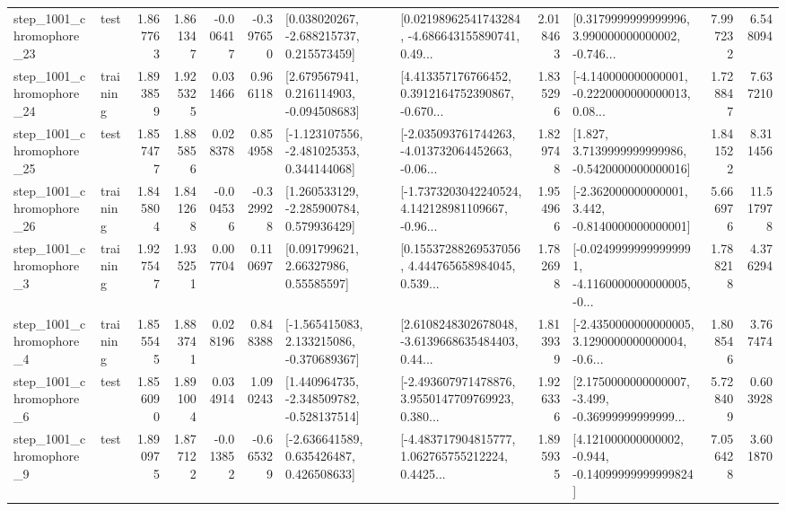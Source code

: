 \begin{tabular}{llrrrrllrlrr}
 step\_1001\_chromophore\_23 &      test &      1.867763 &    1.861347 &     -0.006417 & -0.397650 &    [0.038020267, -2.688215737, 0.215573459] &  [0.02198962541743284, -4.686643155890741, 0.49... &       2.018463 &  [0.3179999999999996, 3.990000000000002, -0.746... &            7.997232 &          6.548094 \\
 step\_1001\_chromophore\_24 &  training &      1.893859 &    1.925325 &      0.031466 &  0.966118 &    [2.679567941, 0.216114903, -0.094508683] &  [4.413357176766452, 0.3912164752390867, -0.670... &       1.835296 &  [-4.140000000000001, -0.2220000000000013, 0.08... &            1.728847 &          7.637210 \\
 step\_1001\_chromophore\_25 &      test &      1.857477 &    1.885856 &      0.028378 &  0.854958 &   [-1.123107556, -2.481025353, 0.344144068] &  [-2.035093761744263, -4.013732064452663, -0.06... &       1.829748 &   [1.827, 3.7139999999999986, -0.5420000000000016] &            1.841522 &          8.311456 \\
 step\_1001\_chromophore\_26 &  training &      1.845804 &    1.841268 &     -0.004536 & -0.329928 &    [1.260533129, -2.285900784, 0.579936429] &  [-1.7373203042240524, 4.142128981109667, -0.96... &       1.954966 &   [-2.362000000000001, 3.442, -0.8140000000000001] &            5.666976 &         11.517978 \\
  step\_1001\_chromophore\_3 &  training &      1.927547 &    1.935251 &      0.007704 &  0.110697 &       [0.091799621, 2.66327986, 0.55585597] &  [0.15537288269537056, 4.444765658984045, 0.539... &       1.782698 &  [-0.02499999999999991, -4.1160000000000005, -0... &            1.788218 &          4.376294 \\
  step\_1001\_chromophore\_4 &  training &      1.855545 &    1.883741 &      0.028196 &  0.848388 &   [-1.565415083, 2.133215086, -0.370689367] &  [2.6108248302678048, -3.6139668635484403, 0.44... &       1.813939 &  [-2.4350000000000005, 3.1290000000000004, -0.6... &            1.808546 &          3.767474 \\
  step\_1001\_chromophore\_6 &      test &      1.856090 &    1.891004 &      0.034914 &  1.090243 &   [1.440964735, -2.348509782, -0.528137514] &  [-2.493607971478876, 3.9550147709769923, 0.380... &       1.926336 &  [2.1750000000000007, -3.499, -0.36999999999999... &            5.728409 &          0.603928 \\
  step\_1001\_chromophore\_9 &      test &      1.890975 &    1.877122 &     -0.013852 & -0.665329 &    [-2.636641589, 0.635426487, 0.426508633] &  [-4.483717904815777, 1.062765755212224, 0.4425... &       1.895935 &  [4.121000000000002, -0.944, -0.14099999999999824] &            7.056428 &          3.601870 \\

\end{tabular}
